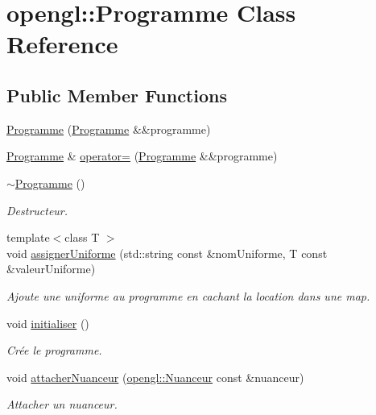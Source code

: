 \hypertarget{classopengl_1_1_programme}{}\section{opengl\+:\+:Programme Class Reference}
\label{classopengl_1_1_programme}
\subsection*{Public Member Functions}
\begin{DoxyCompactItemize}
\item 
\hyperlink{classopengl_1_1_programme_a34a14bec6952843fa70c64ef59e53a8e}{Programme} (\hyperlink{classopengl_1_1_programme}{Programme} \&\&programme)
\item 
\hyperlink{classopengl_1_1_programme}{Programme} \& \hyperlink{classopengl_1_1_programme_a48e706fe89b6fbaf3438bc3ce59b67a1}{operator=} (\hyperlink{classopengl_1_1_programme}{Programme} \&\&programme)
\item 
\hyperlink{classopengl_1_1_programme_a95cc4d2f20727b3328a398765c8e5414}{$\sim$\+Programme} ()
\begin{DoxyCompactList}\small\item\em Destructeur. \end{DoxyCompactList}\item 
{\footnotesize template$<$class T $>$ }\\void \hyperlink{classopengl_1_1_programme_a1912888bb4b273a4e6e046b32983721d}{assigner\+Uniforme} (std\+::string const \&nom\+Uniforme, T const \&valeur\+Uniforme)
\begin{DoxyCompactList}\small\item\em Ajoute une uniforme au programme en cachant la location dans une map. \end{DoxyCompactList}\item 
void \hyperlink{classopengl_1_1_programme_a93cde64c924d65725f477fe320cc38ca}{initialiser} ()
\begin{DoxyCompactList}\small\item\em Crée le programme. \end{DoxyCompactList}\item 
void \hyperlink{classopengl_1_1_programme_a001a0d8331575b6020ea4ae739f87927}{attacher\+Nuanceur} (\hyperlink{classopengl_1_1_nuanceur}{opengl\+::\+Nuanceur} const \&nuanceur)
\begin{DoxyCompactList}\small\item\em Attacher un nuanceur. \end{DoxyCompactList}\item 

\end{DoxyCompactItemize}
